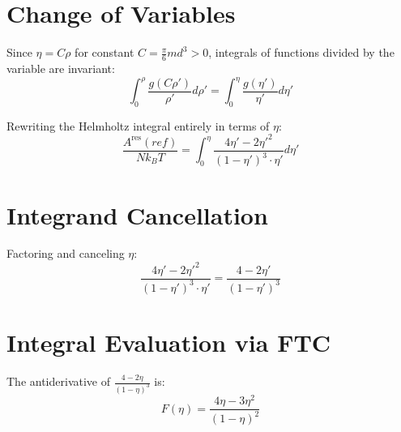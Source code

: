 \section{Change of Variables}

\begin{theorem}
\label{thm:proportionality_integral_change_of_var}
\leanok
Since $\eta = C \rho$ for constant $C = \frac{\pi}{6} m d^3 > 0$, integrals of functions divided by the variable are invariant:
$$\int_0^\rho \frac{g(C \rho')}{\rho'} d\rho' = \int_0^\eta \frac{g(\eta')}{\eta'} d\eta'$$
\end{theorem}

\begin{theorem}
\label{thm:cs_change_variable_to_eta}
\leanok
Rewriting the Helmholtz integral entirely in terms of $\eta$:
$$\frac{A^{\text{res}}(ref)}{Nk_BT} = \int_0^\eta \frac{4\eta' - 2\eta'^2}{(1 - \eta')^3 \cdot \eta'} d\eta'$$
\end{theorem}

\section{Integrand Cancellation}

\begin{theorem}
\label{thm:cs_integrand_cancel_eta}
\leanok
Factoring and canceling $\eta$:
$$\frac{4\eta' - 2\eta'^2}{(1 - \eta')^3 \cdot \eta'} = \frac{4 - 2\eta'}{(1 - \eta')^3}$$
\end{theorem}

\section{Integral Evaluation via FTC}

\begin{definition}[CS Antiderivative]
\label{def:cs_antideriv}
\leanok
The antiderivative of $\frac{4 - 2\eta}{(1 - \eta)^3}$ is:
$$F(\eta) = \frac{4\eta - 3\eta^2}{(1 - \eta)^2}$$
\end{definition}


